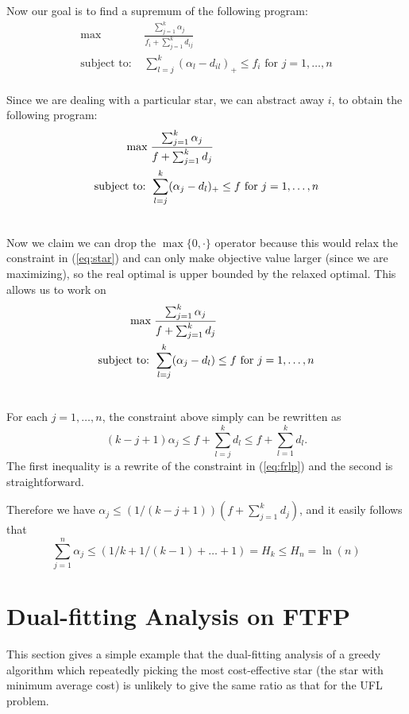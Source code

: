 \documentclass[11pt]{article}
\begin{document}
Now our goal is to find a supremum of the following program:
\begin{align*}
  \max\; & \frac{\sum_{j=1}^k \alpha_j}{f_i + \sum_{j=1}^k d_{ij}}\\
  \textrm{subject to: } & \sum_{l=j}^k (\alpha_l -
  d_{il})_+\leq f_i \textrm{ for } j=1,\ldots,n\\
\end{align*}

Since we are dealing with a particular star, we can abstract
away $i$, to obtain the following program:
\begin{align}
  \label{eq:star}
  \max\; & \frac{\sum_{j=1}^k \alpha_j}{f + \sum_{j=1}^k
    d_j}\\ \notag
  \textrm{subject to: } & \sum_{l=j}^k (\alpha_j - d_{l})_+
  \leq f \textrm{ for } j=1,\ldots,n\\ \notag
\end{align}

Now we claim we can drop the $\max\{0, \cdot\}$ operator
because this would relax the constraint in (\ref{eq:star})
and can only make objective value larger (since we are
maximizing), so the real optimal is upper bounded by the
relaxed optimal. This allows us to work on
\begin{align}
  \label{eq:frlp}
  \max\; & \frac{\sum_{j=1}^k \alpha_j}{f + \sum_{j=1}^k
    d_j}\\ \notag
  \textrm{subject to: } & \sum_{l=j}^k (\alpha_j - d_{l})
  \leq f \textrm{ for } j=1,\ldots,n\\ \notag
\end{align}

For each $j=1,\ldots,n$, the constraint above simply can be
rewritten as
\begin{equation}
  (k-j+1) \alpha_j \leq f + \sum_{l=j}^k d_l \leq f +
  \sum_{l=1}^k d_l.
\end{equation}
The first inequality is a rewrite of the constraint in
(\ref{eq:frlp}) and the second is straightforward.

Therefore we have $\alpha_j \leq (1/(k-j+1)) (f +
\sum_{j=1}^k d_j)$, and it easily follows that
\begin{equation}
  \sum_{j=1}^n \alpha_j \leq (1/k + 1/(k-1) + \ldots + 1) =
  H_k \leq H_n = \ln(n)
\end{equation}

\section{Dual-fitting Analysis on FTFP}
\label{sec:dual2}
This section gives a simple example that the dual-fitting analysis of
a greedy algorithm which repeatedly picking the most cost-effective
star (the star with minimum average cost) is unlikely to give the same
ratio as that for the UFL problem.
\end{document}
